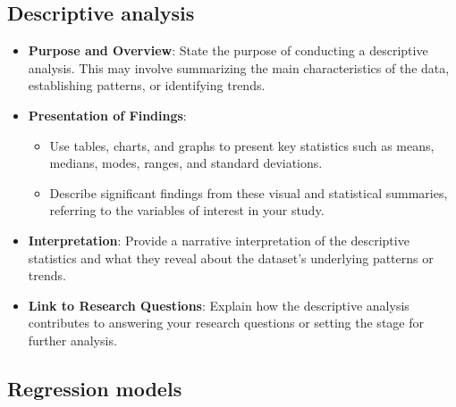 \documentclass[
  12pt,
]{article}
\begin{document}
\subsection{Descriptive analysis}\label{descriptive-analysis}

\begin{itemize}
\item
  \textbf{Purpose and Overview}: State the purpose of conducting a
  descriptive analysis. This may involve summarizing the main
  characteristics of the data, establishing patterns, or identifying
  trends.
\item
  \textbf{Presentation of Findings}:

  \begin{itemize}
  \item
    Use tables, charts, and graphs to present key statistics such as
    means, medians, modes, ranges, and standard deviations.
  \item
    Describe significant findings from these visual and statistical
    summaries, referring to the variables of interest in your study.
  \end{itemize}
\item
  \textbf{Interpretation}: Provide a narrative interpretation of the
  descriptive statistics and what they reveal about the dataset's
  underlying patterns or trends.
\item
  \textbf{Link to Research Questions}: Explain how the descriptive
  analysis contributes to answering your research questions or setting
  the stage for further analysis.
\end{itemize}

\subsection{Regression models}\label{regression-models}
\end{document}
